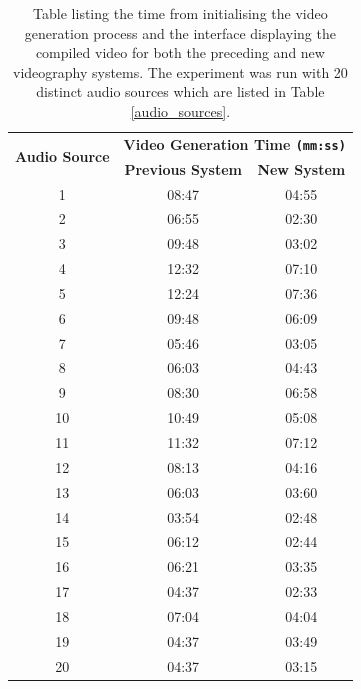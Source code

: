\documentclass{l4proj}
\begin{document}
\begin{appendices}
\begin{table}
    \centering
    \begin{tabular}{|c|c|c|}
        \hline
        \multirow{2}{*}{\textbf{Audio Source}} & 
        \multicolumn{2}{|c|}{\textbf{Video Generation Time \lstinline|(mm:ss)|}} \\
        \cline{2-3} & \textbf{Previous System} & \textbf{New System} \\ 
        \hline
        \hline
        1 & 08:47 & 04:55 \\
        \hline
        2 & 06:55 & 02:30 \\
        \hline
        3 & 09:48 & 03:02 \\
        \hline
        4 & 12:32 & 07:10 \\
        \hline
        5 & 12:24 & 07:36 \\
        \hline
        6 & 09:48 & 06:09 \\
        \hline
        7 & 05:46 & 03:05 \\
        \hline
        8 & 06:03 & 04:43 \\
        \hline
        9 & 08:30 & 06:58 \\
        \hline
        10 & 10:49 & 05:08 \\
        \hline
        11 & 11:32 & 07:12 \\
        \hline
        12 & 08:13 & 04:16 \\
        \hline
        13 & 06:03 & 03:60 \\
        \hline
        14 & 03:54 & 02:48 \\
        \hline
        15 & 06:12 & 02:44 \\
        \hline
        16 & 06:21 & 03:35 \\
        \hline
        17 & 04:37 & 02:33 \\
        \hline
        18 & 07:04 & 04:04 \\
        \hline
        19 & 04:37 & 03:49 \\
        \hline
        20 & 04:37 & 03:15 \\
        \hline
    \end{tabular}
    \caption{Table listing the time from initialising the video generation process and the interface displaying the compiled video for both the preceding and new videography systems. The experiment was run with 20 distinct audio sources which are listed in Table \ref{audio_sources}.}\label{tab:videography_times}
\end{table}



\end{appendices}
\end{document}

